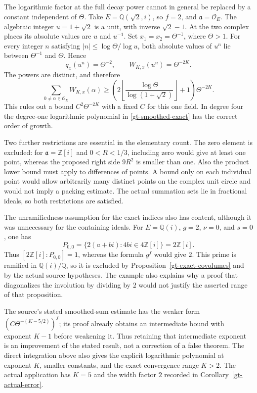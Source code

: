 \begin{example}\label{gt-log-necessary}
The logarithmic factor at the full decay power cannot in general be
replaced by a constant independent of $\Theta$.  Take
$E=\mathbb Q(\sqrt2,i)$, so $f=2$, and
$\mathfrak a=\mathcal O_E$.  The algebraic integer
$u=1+\sqrt2$ is a unit, with inverse $\sqrt2-1$.
At the two complex places its absolute values are $u$ and $u^{-1}$.
Set $x_1=x_2=\Theta^{-1}$, where $\Theta>1$.
For every integer $n$ satisfying
$|n|\leq\log\Theta/\log u$, both absolute values of $u^n$
lie between $\Theta^{-1}$ and $\Theta$.  Hence
\[
 q_x(u^n)=\Theta^{-2},\qquad
 W_{K,x}(u^n)=\Theta^{-2K}.
\]
The powers are distinct, and therefore
\[
 \sum_{0\ne\alpha\in\mathcal O_E}W_{K,x}(\alpha)
 \geq
 \left(2\left\lfloor\frac{\log\Theta}{\log(1+\sqrt2)}
                         \right\rfloor+1\right)\Theta^{-2K}.
\]
This rules out a bound $C^2\Theta^{-2K}$ with a fixed $C$ for this
one field.  In degree four the degree-one logarithmic polynomial
in \eqref{gt-smoothed-exact} has the correct order of growth.
\end{example}

Two further restrictions are essential in the elementary count.
The zero element is excluded: for $\mathfrak a=\mathbb Z[i]$
and $0<R<1/3$, including zero would give at least one point,
whereas the proposed right side $9R^2$ is smaller than one.
Also the product lower bound must apply to differences of points.
A bound only on each individual point would allow arbitrarily many
distinct points on the complex unit circle and would not imply a
packing estimate.  The actual summation sets lie in fractional
ideals, so both restrictions are satisfied.

The unramifiedness assumption for the exact indices also has
content, although it was unnecessary for the containing ideals.
For $E=\mathbb Q(i)$, $g=2$, $\nu=0$, and $s=0$, one has
\[
 P_{0,0}=\{2(a+bi):4bi\in4\mathbb Z[i]\}=2\mathbb Z[i].
\]
Thus $[2\mathbb Z[i]:P_{0,0}]=1$, whereas the formula
$g^f$ would give $2$.  This prime is ramified in
$\mathbb Q(i)/\mathbb Q$, so it is excluded by
Proposition~\ref{gt-exact-covolumes} and by the actual source
hypotheses.  The example also explains why a proof that
diagonalizes the involution by dividing by $2$ would not
justify the asserted range of that proposition.

The source's stated smoothed-sum estimate has the weaker form
$(C\Theta^{-(K-5/2)})^f$; its proof already obtains an intermediate
bound with exponent $K-1$ before weakening it.  Thus retaining that
intermediate exponent is an improvement of the stated result, not
a correction of a false theorem.  The direct integration above
also gives the explicit logarithmic polynomial at exponent $K$,
smaller constants, and the exact convergence range $K>2$.
The actual application has $K=5$ and the width factor $2$ recorded
in Corollary~\ref{gt-actual-error}.


